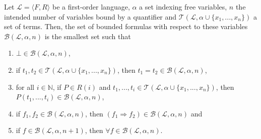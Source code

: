 \begin{definition}[BoundedFormula]\label{def:bf}
    \leanok
    Let $\mathcal{L} = \langle F, R \rangle$ be a first-order language, $\alpha$ a set indexing free variables, $n$ the intended number of variables bound by a quantifier and $\mathcal{T}(\mathcal{L}, \alpha \cup \{x_1,...,x_n\})$ a set of terms. Then, the set of bounded formulas with respect to these variables $\mathcal{B}(\mathcal{L},\alpha,n)$ is the smallest set such that
    \begin{enumerate}
        \item $\bot \in \mathcal{B}(\mathcal{L},\alpha,n)$,
        \item if $t_1,t_2 \in \mathcal{T}(\mathcal{L}, \alpha \cup \{x_1,...,x_n\})$, then $t_1 = t_2 \in \mathcal{B}(\mathcal{L},\alpha,n)$,
        \item for all $i \in \mathbb{N}$, if $P \in R(i)$ and $t_1,...,t_i \in \mathcal{T}(\mathcal{L}, \alpha \cup \{x_1,...,x_n\})$, then $P(t_1,...,t_i) \in \mathcal{B}(\mathcal{L},\alpha,n)$,
        \item if $f_1,f_2 \in \mathcal{B}(\mathcal{L},\alpha,n)$, then $(f_1 \Rightarrow f_2) \in \mathcal{B}(\mathcal{L},\alpha,n)$ and
        \item if $f \in \mathcal{B}(\mathcal{L},\alpha,n+1)$, then $\forall f \in \mathcal{B}(\mathcal{L},\alpha,n)$.
    \end{enumerate}
\end{definition}


